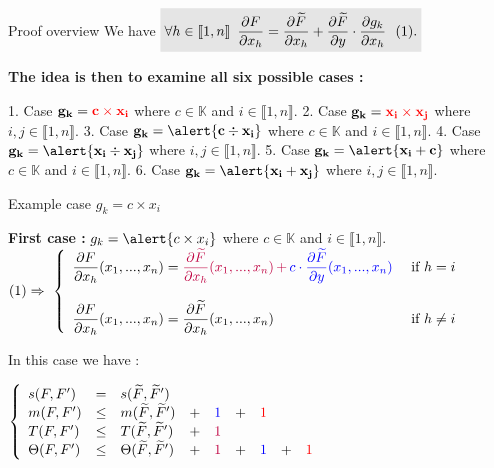 \begin{frame}{Proof overview}
    We have 
    $
    \colbox{
        \forall h \in \llbracket 1,n \rrbracket \,\,\, \pd{F}{x_h} = \pd{\widetilde{F}}{x_h} + \pd{\widetilde{F}}{y}\cdot\pd{g_k}{x_h}\ \ (1).
    }
    $

\vskip 0.5cm
\textbf{The idea is then to examine all six possible cases :}
\vskip 0.3cm

1. Case $\mathbf{g_k = \textcolor{red}{c \times x_i}}$ where $c \in \mathbb{K}$ and $i \in \llbracket 1,n \rrbracket$.
\vskip 0.1cm
2. Case $\mathbf{g_k = \textcolor{red}{x_i \times x_j}}$ where $i,j \in \llbracket 1,n \rrbracket$.
\vskip 0.1cm
3. Case $\mathbf{g_k = \alert{c \div x_i}}$ where $c \in \mathbb{K}$ and $i \in \llbracket 1,n \rrbracket$.
\vskip 0.1cm
4. Case $\mathbf{g_k = \alert{x_i \div x_j}}$ where $i,j \in \llbracket 1,n \rrbracket$.
\vskip 0.1cm
5. Case $\mathbf{g_k = \alert{x_i+c}}$ where $c \in \mathbb{K}$ and $i \in \llbracket 1,n \rrbracket$.
\vskip 0.1cm
6. Case $\mathbf{g_k = \alert{x_i+x_j}}$ where $i,j \in \llbracket 1,n \rrbracket$.

\end{frame}

\begin{frame}{Example case $g_k = c \times x_i$}

\textbf{First case :} $g_k = \alert{c \times x_i}$ where $c \in \mathbb{K}$ and $i \in \llbracket 1,n \rrbracket$.
\vskip 0.5cm
\small
$
   (1) \Rightarrow~\left \{
   \begin{array}{l r}
   \dfrac{\partial F}{\partial x_h}(x_1,...,x_n) = \textcolor{purple}{\dfrac{\partial \widetilde{F}}{\partial x_h}(x_1,...,x_n) \,\mathbf{+}}\, \textcolor{blue}{c \cdot \dfrac{\partial \widetilde{F}}{\partial y}(x_1,...,x_n)} & \textrm{ if }h = i\\
        \\
       \dfrac{\partial F}{\partial x_h}(x_1,...,x_n) = \dfrac{\partial \widetilde{F}}{\partial x_h}(x_1,...,x_n) & \textrm{ if } h \neq i
   \end{array}
   \right .
$

\vskip 0.5cm
In this case we have :
\vskip 0.3cm

$
   \left\{
   \begin{array}{l c l l l l l l l}
       s(F,F') & = & s(\widetilde{F},\widetilde{F}') \\
       m(F,F') &\leq & m(\widetilde{F},\widetilde{F}')&+&\textcolor{blue}{1}&+&\textcolor{red}{1}\\
       T(F,F') &\leq & T(\widetilde{F},\widetilde{F}')&+&\textcolor{purple}{1}\\
       \Theta(F,F') &\leq & \Theta(\widetilde{F},\widetilde{F}')&+&\textcolor{purple}{1}&+&\textcolor{blue}{1}&+&\textcolor{red}{1}\\
   \end{array}
   \right .
$

\end{frame}

